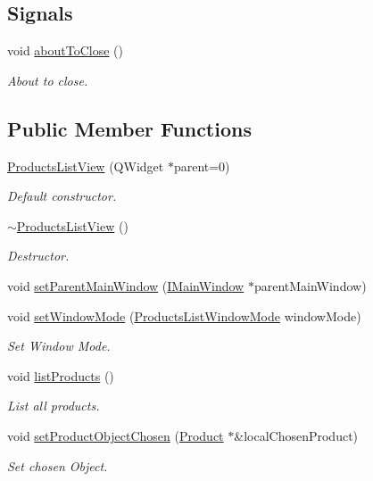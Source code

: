 \subsection*{\-Signals}
\begin{DoxyCompactItemize}
\item 
void \hyperlink{class_products_list_view_aa9cf89d19e61fb62739485aba58b7fd7}{about\-To\-Close} ()
\begin{DoxyCompactList}\small\item\em \-About to close. \end{DoxyCompactList}\end{DoxyCompactItemize}
\subsection*{\-Public \-Member \-Functions}
\begin{DoxyCompactItemize}
\item 
\hyperlink{class_products_list_view_af4c799112174293e46b0587cdaab5664}{\-Products\-List\-View} (\-Q\-Widget $\ast$parent=0)
\begin{DoxyCompactList}\small\item\em \-Default constructor. \end{DoxyCompactList}\item 
\hyperlink{class_products_list_view_a85834cf01fe1fb0891990f13898437b6}{$\sim$\-Products\-List\-View} ()
\begin{DoxyCompactList}\small\item\em \-Destructor. \end{DoxyCompactList}\item 
void \hyperlink{class_products_list_view_a989879ccf014f5d4477879e72092990d}{set\-Parent\-Main\-Window} (\hyperlink{class_i_main_window}{\-I\-Main\-Window} $\ast$parent\-Main\-Window)
\item 
void \hyperlink{class_products_list_view_a3bb3f4a93687505cdbf6a7c929bfa2da}{set\-Window\-Mode} (\hyperlink{class_products_list_view_a9188ca0288825afb653acd945bfa9731}{\-Products\-List\-Window\-Mode} window\-Mode)
\begin{DoxyCompactList}\small\item\em \-Set \-Window \-Mode. \end{DoxyCompactList}\item 
void \hyperlink{class_products_list_view_a4fcddf2fad45165406e6044453043b16}{list\-Products} ()
\begin{DoxyCompactList}\small\item\em \-List all products. \end{DoxyCompactList}\item 
void \hyperlink{class_products_list_view_a2a8b3f207d234192b0b5ec828a086169}{set\-Product\-Object\-Chosen} (\hyperlink{class_product}{\-Product} $\ast$\&local\-Chosen\-Product)
\begin{DoxyCompactList}\small\item\em \-Set chosen \-Object. \end{DoxyCompactList}\end{DoxyCompactItemize}


